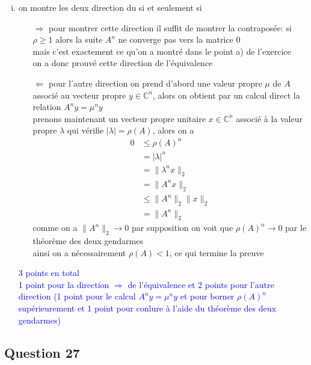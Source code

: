 \documentclass[11pt, a4paper, oneside]{article}
\begin{document}
\begin{enumerate}[i)]
\item 
on montre les deux direction du si et seulement si
\begin{itemize}
    \item [$\Longrightarrow$] pour montrer cette direction il suffit de montrer la contraposée: si $\rho \geq 1$ alors la suite $A^n$ ne converge pas vers la matrice 0 \\
    mais c'est exactement ce qu'on a montré dans le point a) de l'exercice \\
    {\tiny on a donc prouvé cette direction de l'équivalence}
    \item [$\Longleftarrow$] pour l'autre direction {\tiny on prend d'abord une valeur propre $\mu$ de $A$ associé au vecteur propre $y \in \mathbb{C}^n$, alors on obtient par un calcul direct la relation $A^ny = \mu^n y$} \\
    prenons maintenant un vecteur propre unitaire $x \in \mathbb{C}^n$ associé à la valeur propre $\lambda$ qui vérifie $|\lambda| = \rho(A)$, alors on a
    \begin{align*}
        0 &\leq \rho(A)^n \\
        &= |\lambda|^n \\
        &= \lVert \lambda^nx \rVert_2 \\
        &= \lVert A^nx \rVert_2 \\
        &\leq \lVert A^n \rVert_2 \lVert x \rVert_2 \\
        &= \lVert A^n \rVert_2
    \end{align*}
    comme on a $\lVert A^n \rVert_2 \rightarrow 0$ par supposition on voit que $\rho(A)^n \rightarrow 0$ par le théorème des deux gendarmes \\
    ainsi on a nécessairement $\rho(A)<1$, {\tiny ce qui termine la preuve}
\end{itemize}
\textcolor{blue}{3 points en total \\ 1 point pour la direction $\Longrightarrow$ de l'équivalence et 2 points pour l'autre direction (1 point pour le calcul $A^ny = \mu^n y$ et pour borner $\rho(A)^n$ supérieurement et 1 point pour conlure à l'aide du théorème des deux gendarmes)} 
    
\end{enumerate}

\newpage
\subsection*{Question 27}
\end{document}
